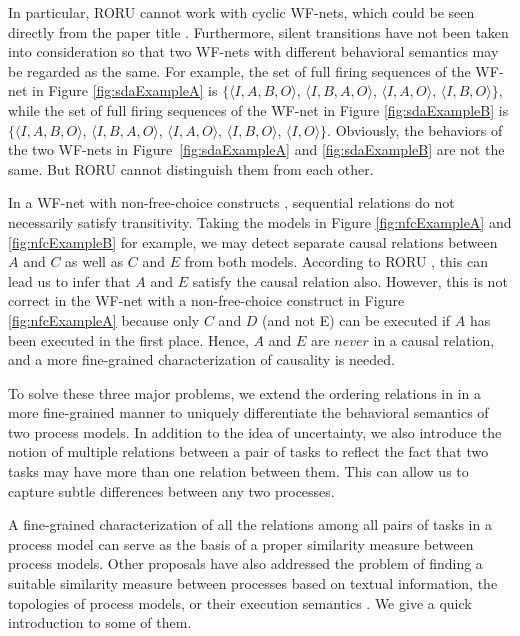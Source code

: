 \documentclass{llncs}
\begin{document}
In particular, RORU cannot work with cyclic WF-nets, which could be seen directly from the paper title \cite{jin2014computing}. Furthermore, silent transitions have not been taken into consideration so that two WF-nets with different behavioral semantics may be regarded as the same. For example, the set of full firing sequences of the WF-net in Figure \ref{fig:sdaExampleA} is $\{\langle I,A,B,O\rangle$, $\langle I,B,A,O\rangle$, $\langle I,A,O\rangle$, $\langle I,B,O\rangle\}$, while the set of full firing sequences of the WF-net in Figure \ref{fig:sdaExampleB} is $\{\langle I,A,B,O\rangle$, $\langle I,B,A,O\rangle$, $\langle I,A,O\rangle$, $\langle I,B,O\rangle$, $\langle I,O\rangle\}$. Obviously, the behaviors of the two WF-nets in Figure~\ref{fig:sdaExampleA} and \ref{fig:sdaExampleB} are not the same. But RORU cannot distinguish them from each other.

In a WF-net with non-free-choice constructs \cite{de2003workflow}, sequential relations do not necessarily satisfy transitivity. Taking the models in Figure \ref{fig:nfcExampleA} and \ref{fig:nfcExampleB} for example, we may detect separate causal relations between $A$ and $C$ as well as $C$ and $E$ from both models. According to RORU \cite{jin2014computing}, this can lead us to infer that $A$ and $E$ satisfy the causal relation also. However, this is not correct in the WF-net with a non-free-choice construct in Figure \ref{fig:nfcExampleA} because only $C$ and $D$ (and not E) can be executed if $A$ has been executed in the first place. Hence, $A$ and $E$ are $never$ in a causal relation, and a more fine-grained characterization of causality is needed. 

To solve these three major problems, we extend the ordering relations in \cite{jin2014computing} in a more fine-grained manner to uniquely differentiate the behavioral semantics of two process models. In addition to the idea of uncertainty, we also introduce the notion of multiple relations between a pair of tasks to reflect the fact that two tasks may have more than one relation between them.  This can allow us to capture subtle differences between any two processes.

A fine-grained characterization of all the relations among all pairs of tasks in a process model can serve as the basis of a proper similarity measure between process models. Other proposals have also addressed the problem of finding a suitable similarity measure between processes based on textual information, the topologies of process models, or their execution semantics \cite{weidlich2011efficient}. We give a quick introduction to some of them.
\end{document}
